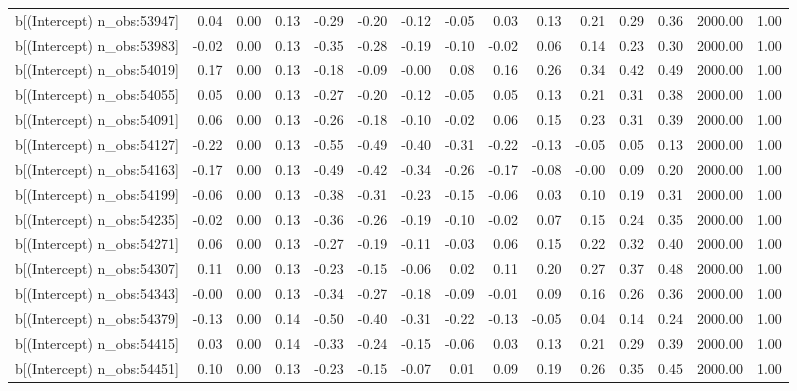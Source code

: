 \begin{table}[ht]
\begin{tabular}{rrrrrrrrrrrrrrr}
  b[(Intercept) n\_obs:53947] & 0.04 & 0.00 & 0.13 & -0.29 & -0.20 & -0.12 & -0.05 & 0.03 & 0.13 & 0.21 & 0.29 & 0.36 & 2000.00 & 1.00 \\ 
  b[(Intercept) n\_obs:53983] & -0.02 & 0.00 & 0.13 & -0.35 & -0.28 & -0.19 & -0.10 & -0.02 & 0.06 & 0.14 & 0.23 & 0.30 & 2000.00 & 1.00 \\ 
  b[(Intercept) n\_obs:54019] & 0.17 & 0.00 & 0.13 & -0.18 & -0.09 & -0.00 & 0.08 & 0.16 & 0.26 & 0.34 & 0.42 & 0.49 & 2000.00 & 1.00 \\ 
  b[(Intercept) n\_obs:54055] & 0.05 & 0.00 & 0.13 & -0.27 & -0.20 & -0.12 & -0.05 & 0.05 & 0.13 & 0.21 & 0.31 & 0.38 & 2000.00 & 1.00 \\ 
  b[(Intercept) n\_obs:54091] & 0.06 & 0.00 & 0.13 & -0.26 & -0.18 & -0.10 & -0.02 & 0.06 & 0.15 & 0.23 & 0.31 & 0.39 & 2000.00 & 1.00 \\ 
  b[(Intercept) n\_obs:54127] & -0.22 & 0.00 & 0.13 & -0.55 & -0.49 & -0.40 & -0.31 & -0.22 & -0.13 & -0.05 & 0.05 & 0.13 & 2000.00 & 1.00 \\ 
  b[(Intercept) n\_obs:54163] & -0.17 & 0.00 & 0.13 & -0.49 & -0.42 & -0.34 & -0.26 & -0.17 & -0.08 & -0.00 & 0.09 & 0.20 & 2000.00 & 1.00 \\ 
  b[(Intercept) n\_obs:54199] & -0.06 & 0.00 & 0.13 & -0.38 & -0.31 & -0.23 & -0.15 & -0.06 & 0.03 & 0.10 & 0.19 & 0.31 & 2000.00 & 1.00 \\ 
  b[(Intercept) n\_obs:54235] & -0.02 & 0.00 & 0.13 & -0.36 & -0.26 & -0.19 & -0.10 & -0.02 & 0.07 & 0.15 & 0.24 & 0.35 & 2000.00 & 1.00 \\ 
  b[(Intercept) n\_obs:54271] & 0.06 & 0.00 & 0.13 & -0.27 & -0.19 & -0.11 & -0.03 & 0.06 & 0.15 & 0.22 & 0.32 & 0.40 & 2000.00 & 1.00 \\ 
  b[(Intercept) n\_obs:54307] & 0.11 & 0.00 & 0.13 & -0.23 & -0.15 & -0.06 & 0.02 & 0.11 & 0.20 & 0.27 & 0.37 & 0.48 & 2000.00 & 1.00 \\ 
  b[(Intercept) n\_obs:54343] & -0.00 & 0.00 & 0.13 & -0.34 & -0.27 & -0.18 & -0.09 & -0.01 & 0.09 & 0.16 & 0.26 & 0.36 & 2000.00 & 1.00 \\ 
  b[(Intercept) n\_obs:54379] & -0.13 & 0.00 & 0.14 & -0.50 & -0.40 & -0.31 & -0.22 & -0.13 & -0.05 & 0.04 & 0.14 & 0.24 & 2000.00 & 1.00 \\ 
  b[(Intercept) n\_obs:54415] & 0.03 & 0.00 & 0.14 & -0.33 & -0.24 & -0.15 & -0.06 & 0.03 & 0.13 & 0.21 & 0.29 & 0.39 & 2000.00 & 1.00 \\ 
  b[(Intercept) n\_obs:54451] & 0.10 & 0.00 & 0.13 & -0.23 & -0.15 & -0.07 & 0.01 & 0.09 & 0.19 & 0.26 & 0.35 & 0.45 & 2000.00 & 1.00 \\ 

\end{tabular}
\end{table}
